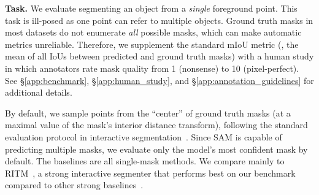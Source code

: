 \documentclass[10pt,twocolumn,letterpaper]{article}
\renewcommand{\paragraph}[1]{\vspace{1.25mm}\noindent\textbf{#1}}
\newcommand{\sam}{SAM\xspace}
\begin{document}
\paragraph{Task.} We evaluate segmenting an object from a \emph{single} foreground point. This task is ill-posed as one point can refer to multiple objects. Ground truth masks in most datasets do not enumerate \emph{all} possible masks, which can make automatic metrics unreliable. Therefore, we supplement the standard mIoU metric (\ie, the mean of all IoUs between predicted and ground truth masks) with a human study in which annotators rate mask quality from 1 (nonsense) to 10 (pixel-perfect). See \S\ref{app:benchmark}, \S\ref{app:human_study}, and \S\ref{app:annotation_guidelines} for additional details.

By default, we sample points from the ``center'' of ground truth masks (at a maximal value of the mask's interior distance transform), following the standard evaluation protocol in interactive segmentation~\cite{sofiiuk2022reviving}. Since \sam is capable of predicting multiple masks, we evaluate only the model's most confident mask by default. The baselines are all single-mask methods. We compare mainly to RITM~\cite{sofiiuk2022reviving}, a strong interactive segmenter that performs best on our benchmark compared to other strong baselines~\cite{liu2022simpleclick,chen2022focalclick}.
\end{document}
